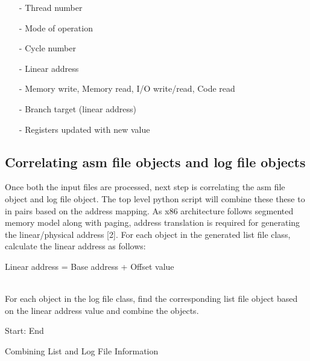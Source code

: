 \begin{itemize}
 \item[-] Thread number
 \item[-]  Mode of operation
 \item[-]  Cycle number
 \item[-]  Linear address
 \item[-]  Memory write, Memory read, I/O write/read, Code read
 \item[-]  Branch target (linear address)
 \item[-]  Registers updated with new value
\end{itemize}


\subsection {Correlating asm file objects and log file objects}

Once both the input files are processed, next step is correlating the asm file object and log file object. The top level python script will combine these these to in pairs based on the address mapping. As x86 architecture follows segmented memory model along with paging, address translation is required for generating the linear/physical address [2]. For each object in the generated list file class, calculate the linear address as follows:
\\
\centerline{Linear address = Base address + Offset value}
\\
For each object in the log file class, find the corresponding list file object based on the linear address value and combine the objects.


\vspace{1.5cm}

\IncMargin{1em}
\begin{algorithm}[H]
\DontPrintSemicolon
{} 

\BlankLine
Start: \;
End \;
\caption{Combining List and Log File Information}
\end{algorithm}\DecMargin{1em}

